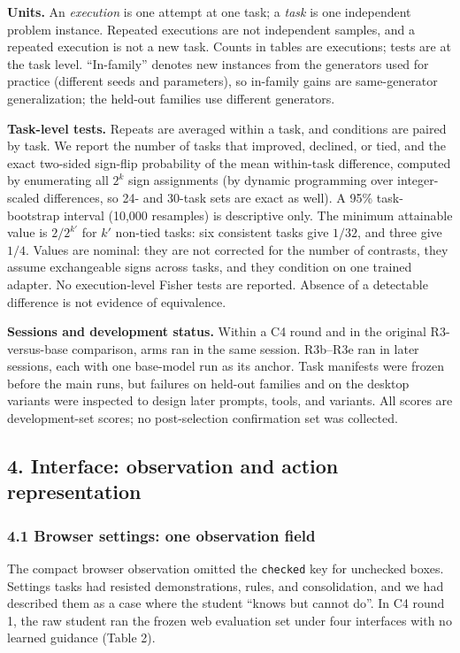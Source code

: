 \documentclass[
  10pt,
]{article}
\begin{document}
\textbf{Units.} An \emph{execution} is one attempt at one task; a
\emph{task} is one independent problem instance. Repeated executions are
not independent samples, and a repeated execution is not a new task.
Counts in tables are executions; tests are at the task level.
``In-family'' denotes new instances from the generators used for
practice (different seeds and parameters), so in-family gains are
same-generator generalization; the held-out families use different
generators.

\textbf{Task-level tests.} Repeats are averaged within a task, and
conditions are paired by task. We report the number of tasks that
improved, declined, or tied, and the exact two-sided sign-flip
probability of the mean within-task difference, computed by enumerating
all \(2^k\) sign assignments (by dynamic programming over integer-scaled
differences, so 24- and 30-task sets are exact as well). A 95\%
task-bootstrap interval (10,000 resamples) is descriptive only. The
minimum attainable value is \(2/2^{k'}\) for \(k'\) non-tied tasks: six
consistent tasks give \(1/32\), and three give \(1/4\). Values are
nominal: they are not corrected for the number of contrasts, they assume
exchangeable signs across tasks, and they condition on one trained
adapter. No execution-level Fisher tests are reported. Absence of a
detectable difference is not evidence of equivalence.

\textbf{Sessions and development status.} Within a C4 round and in the
original R3-versus-base comparison, arms ran in the same session.
R3b--R3e ran in later sessions, each with one base-model run as its
anchor. Task manifests were frozen before the main runs, but failures on
held-out families and on the desktop variants were inspected to design
later prompts, tools, and variants. All scores are development-set
scores; no post-selection confirmation set was collected.

\subsection{4. Interface: observation and action
representation}\label{interface-observation-and-action-representation}

\subsubsection{4.1 Browser settings: one observation
field}\label{browser-settings-one-observation-field}

The compact browser observation omitted the \texttt{checked} key for
unchecked boxes. Settings tasks had resisted demonstrations, rules, and
consolidation, and we had described them as a case where the student
``knows but cannot do''. In C4 round 1, the raw student ran the frozen
web evaluation set under four interfaces with no learned guidance (Table
2).
\end{document}
